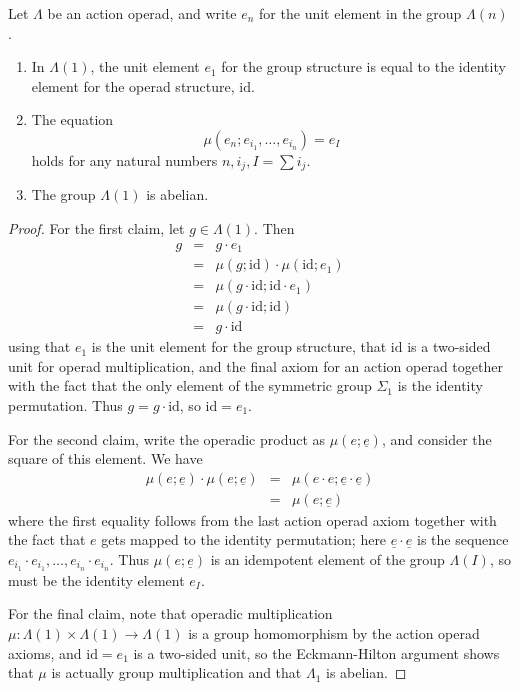 \documentclass{amsbook} %
\numberwithin{section}{chapter}
\begin{document}
\begin{lem}\label{calclem}
Let $\Lambda$ be an action operad, and write $e_{n}$ for the unit element in the group $\Lambda(n)$.
\begin{enumerate}
\item In $\Lambda(1)$, the unit element $e_{1}$ for the group structure is equal to the identity element for the operad structure, $\textrm{id}$.
\item The equation
\[
\mu(e_{n}; e_{i_{1}}, \ldots, e_{i_{n}}) = e_{I}
\]
holds for any natural numbers $n, i_{j}, I = \sum i_{j}$.
\item The group $\Lambda(1)$ is abelian.
\end{enumerate}
\end{lem}
\begin{proof}
For the first claim, let $g \in \Lambda(1)$.  Then
\[
\begin{array}{rcl}
g & = & g \cdot e_{1} \\
& = & \mu(g; \textrm{id}) \cdot \mu(\textrm{id}; e_{1}) \\
& = & \mu(g \cdot \textrm{id}; \textrm{id} \cdot e_{1}) \\
& = & \mu(g \cdot \textrm{id}; \textrm{id}) \\
& = & g \cdot \textrm{id}
\end{array}
\]
using that $e_{1}$ is the unit element for the group structure, that $\textrm{id}$ is a two-sided unit for operad multiplication, and the final axiom for an action operad together with the fact that the only element of the symmetric group $\Sigma_{1}$ is the identity permutation.  Thus $g = g \cdot \textrm{id}$, so $\textrm{id} = e_{1}$.

For the second claim, write the operadic product as $\mu(e; \underline{e})$, and consider the square of this element. We have
\[
\begin{array}{rcl}
\mu(e; \underline{e}) \cdot \mu(e; \underline{e}) & = & \mu(e \cdot e; \underline{e} \cdot \underline{e}) \\
&= & \mu(e; \underline{e})
\end{array}
\]
where the first equality follows from the last action operad axiom together with the fact that $e$ gets mapped to the identity permutation; here $\underline{e} \cdot \underline{e}$ is the sequence $e_{i_{1}} \cdot e_{i_{1}}, \ldots, e_{i_{n}} \cdot e_{i_{n}}$.  Thus $\mu(e; \underline{e})$ is an idempotent element of the group $\Lambda(I)$, so must be the identity element $e_{I}$.

For the final claim, note that operadic multiplication $\mu:\Lambda(1) \times \Lambda(1) \rightarrow \Lambda(1)$ is a group homomorphism by the action operad axioms, and $\textrm{id} = e_{1}$ is a two-sided unit, so the Eckmann-Hilton argument shows that $\mu$ is actually group multiplication and that $\Lambda_{1}$ is abelian.
\end{proof}
\end{document}
